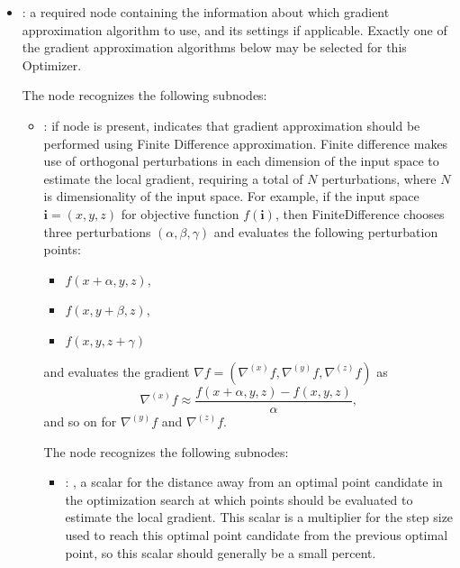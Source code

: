\begin{itemize}
    \item {}:
      a required node containing the information about which gradient approximation algorithm to
      use, and its settings if applicable. Exactly one of the gradient approximation algorithms
      below may be selected for this Optimizer.

      The  node recognizes the following subnodes:
      \begin{itemize}
        \item {}:
          if node is present, indicates that gradient approximation should be performed
          using Finite Difference approximation. Finite difference makes use of orthogonal
          perturbations         in each dimension of the input space to estimate the local gradient,
          requiring a total of $N$         perturbations, where $N$ is dimensionality of the input
          space. For example, if the input space         $\mathbf{i} = (x, y, z)$ for objective
          function $f(\mathbf{i})$, then FiniteDifference chooses         three perturbations
          $(\alpha, \beta, \gamma)$ and evaluates the following perturbation points:
          \begin{itemize}           \item $f(x+\alpha, y, z)$,           \item $f(x, y+\beta, z)$,
          \item $f(x, y, z+\gamma)$         \end{itemize}         and evaluates the gradient $\nabla
          f = (\nabla^{(x)} f, \nabla^{(y)} f, \nabla^{(z)} f)$ as         \begin{equation*}
          \nabla^{(x)}f \approx \frac{f(x+\alpha, y, z) - f(x, y, z)}{\alpha},
          \end{equation*}         and so on for $ \nabla^{(y)}f$ and $\nabla^{(z)}f$.

          The  node recognizes the following subnodes:
          \begin{itemize}
            \item {}: ,
              a scalar for the distance away from an optimal point candidate in the optimization
              search at which points should be evaluated to estimate the local gradient. This scalar
              is a         multiplier for the step size used to reach this optimal point candidate
              from the previous         optimal point, so this scalar should generally be a small
              percent. 
          \end{itemize}


\end{itemize}
\end{itemize}
